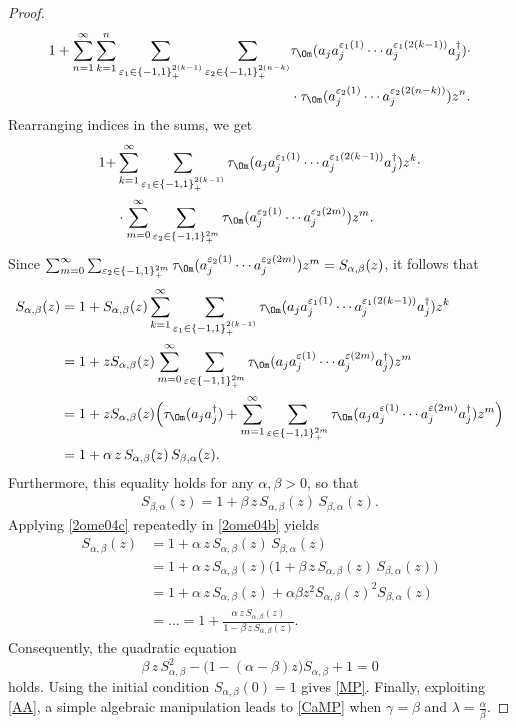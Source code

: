 \documentclass[12pt]{amsart}
\numberwithin{equation}{section}
\def\a{\alpha}
\def\b{\beta}
\def\g{\gamma}  \def\G{\Gamma}
\def\eps{\varepsilon}
\def\l{\lambda} \def\L{\Lambda}
\def\t{\tau}
\theoremstyle{definition}
\begin{document}
\begin{proof}
\begin{align*}
1 + \sum_{n=1}^\infty \sum_{k=1}^n
\sum_{\eps_1\in\{-1,1\}^{2(k-1)}_+}
\sum_{\eps_2\in\{-1,1\}^{2(n-k)}_+}
& \t_\Om(a_j a_j^{\eps_1(1)} \cdots a_j^{\eps_1(2(k-1))} a_j^\dag) \cdot \\
& \cdot \t_\Om( a_j^{\eps_2(1)} \cdots a_j^{\eps_2(2(n-k))}) z^n.
\end{align*}
Rearranging indices in the sums, we get
\begin{align*}
1 + &\sum_{k=1}^\infty \sum_{\eps_1\in\{-1,1\}^{2(k-1)}_+}
\t_\Om(a_j a_j^{\eps_1(1)} \cdots a_j^{\eps_1(2(k-1))} a_j^\dag) z^k
\cdot\\
& \cdot \sum_{m=0}^\infty \sum_{\eps_2\in\{-1,1\}^{2m}_+}
\t_\Om(a_j^{\eps_2(1)} \cdots a_j^{\eps_2(2m)}) z^m.
\end{align*}
Since $\sum_{m=0}^\infty \sum_{\eps_2\in\{-1,1\}^{2m}_+} \t_\Om( a_j^{\eps_2(1)} \cdots a_j^{\eps_2(2m)}) z^m = S_{\a,\b}(z)$, it follows that
\begin{align}\label{2ome04b}
\begin{split}
S_{\a,\b}(z)
&= 1 + S_{\a,\b}(z) \sum_{k=1}^\infty \sum_{\eps_1\in\{-1,1\}^{2(k-1)}_+} \t_\Om(a_j a_j^{\eps_1(1)} \cdots a_j^{\eps_1(2(k-1))} a_j^\dag) z^k \\
&= 1 + z S_{\a,\b}(z) \sum_{m=0}^\infty \sum_{\eps\in\{-1,1\}^{2m}_+} \t_\Om(a_j a_j^{\eps(1)} \cdots a_j^{\eps(2m)} a_j^\dag) z^m \\
&= 1 + z S_{\a,\b}(z) \Big( \t_\Om(a_j a_j^\dag)+ \sum_{m=1}^\infty \sum_{\eps\in\{-1,1\}^{2m}_+} \t_\Om(a_j a_j^{\eps(1)} \cdots a_j^{\eps(2m)} a_j^\dag) z^m \Big) \\
&= 1 + \a\, z\, S_{\a,\b}(z) \, S_{\b,\a}(z).
\end{split}
\end{align}
Furthermore, this equality holds for any $\a, \b > 0$, so that
\begin{align}\label{2ome04c}
S_{\b,\a}(z) = 1 + \b\, z\, S_{\a,\b}(z) \, S_{\b,\a}(z).
\end{align}
Applying \eqref{2ome04c} repeatedly in \eqref{2ome04b} yields
\begin{align*}
S_{\a,\b}(z) &= 1 + \a\, z\, S_{\a,\b}(z) \, S_{\b,\a}(z) \\
&= 1 + \a\, z\, S_{\a,\b}(z) \big(1 + \b\, z\, S_{\a,\b}(z) \, S_{\b,\a}(z) \big) \\
&= 1 + \a\, z\, S_{\a,\b}(z) + \a \b z^2 S_{\a,\b}(z)^2 S_{\b,\a}(z) \\
&= \dots = 1 + \frac{\a\, z\, S_{\a,\b}(z)}{1 - \b\, z\, S_{\a,\b}(z)}.
\end{align*}
Consequently, the quadratic equation
\[
\b\, z\, S_{\a,\b}^2 - \big(1 - (\a-\b) z\big) S_{\a,\b} + 1 = 0
\]
holds. Using the initial condition $S_{\a,\b}(0) = 1$ gives \eqref{MP}. Finally, exploiting \eqref{AA}, a simple algebraic manipulation leads to \eqref{CaMP} when $\g = \b$ and $\l = \frac{\a}{\b}$.
\end{proof}
\end{document}
